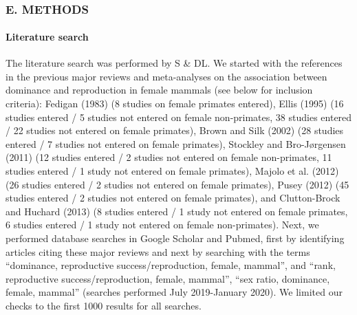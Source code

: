 \documentclass[]{article}
\let\oldparagraph\paragraph
\renewcommand{\paragraph}[1]{\oldparagraph{#1}\mbox{}}
\begin{document}
~

\hypertarget{e.-methods}{%
\subsubsection{E. METHODS}\label{e.-methods}}

\hypertarget{literature-search}{%
\paragraph{\texorpdfstring{\textbf{Literature
search}}{Literature search}}\label{literature-search}}

The literature search was performed by S \& DL. We started with the
references in the previous major reviews and meta-analyses on the
association between dominance and reproduction in female mammals (see
below for inclusion criteria): Fedigan (1983) (8 studies on female
primates entered), Ellis (1995) (16 studies entered / 5 studies not
entered on female non-primates, 38 studies entered / 22 studies not
entered on female primates), Brown and Silk (2002) (28 studies entered /
7 studies not entered on female primates), Stockley and Bro-Jørgensen
(2011) (12 studies entered / 2 studies not entered on female
non-primates, 11 studies entered / 1 study not entered on female
primates), Majolo et al. (2012) (26 studies entered / 2 studies not
entered on female primates), Pusey (2012) (45 studies entered / 2
studies not entered on female primates), and Clutton-Brock and Huchard
(2013) (8 studies entered / 1 study not entered on female primates, 6
studies entered / 1 study not entered on female non-primates). Next, we
performed database searches in Google Scholar and Pubmed, first by
identifying articles citing these major reviews and next by searching
with the terms ``dominance, reproductive success/reproduction, female,
mammal'', and ``rank, reproductive success/reproduction, female,
mammal'', ``sex ratio, dominance, female, mammal'' (searches performed
July 2019-January 2020). We limited our checks to the first 1000 results
for all searches.
\end{document}
